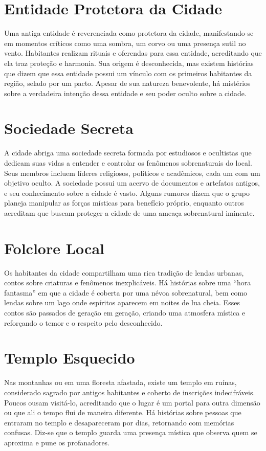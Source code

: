 \section{Entidade Protetora da Cidade}
Uma antiga entidade é reverenciada como protetora da cidade, manifestando-se em momentos críticos como uma sombra, um corvo ou uma presença sutil no vento. Habitantes realizam rituais e oferendas para essa entidade, acreditando que ela traz proteção e harmonia. Sua origem é desconhecida, mas existem histórias que dizem que essa entidade possui um vínculo com os primeiros habitantes da região, selado por um pacto. Apesar de sua natureza benevolente, há mistérios sobre a verdadeira intenção dessa entidade e seu poder oculto sobre a cidade.

\section{Sociedade Secreta}
A cidade abriga uma sociedade secreta formada por estudiosos e ocultistas que dedicam suas vidas a entender e controlar os fenômenos sobrenaturais do local. Seus membros incluem líderes religiosos, políticos e acadêmicos, cada um com um objetivo oculto. A sociedade possui um acervo de documentos e artefatos antigos, e seu conhecimento sobre a cidade é vasto. Alguns rumores dizem que o grupo planeja manipular as forças místicas para benefício próprio, enquanto outros acreditam que buscam proteger a cidade de uma ameaça sobrenatural iminente.

\section{Folclore Local}
Os habitantes da cidade compartilham uma rica tradição de lendas urbanas, contos sobre criaturas e fenômenos inexplicáveis. Há histórias sobre uma ``hora fantasma'' em que a cidade é coberta por uma névoa sobrenatural, bem como lendas sobre um lago onde espíritos aparecem em noites de lua cheia. Esses contos são passados de geração em geração, criando uma atmosfera mística e reforçando o temor e o respeito pelo desconhecido.

\section{Templo Esquecido}
Nas montanhas ou em uma floresta afastada, existe um templo em ruínas, considerado sagrado por antigos habitantes e coberto de inscrições indecifráveis. Poucos ousam visitá-lo, acreditando que o lugar é um portal para outra dimensão ou que ali o tempo flui de maneira diferente. Há histórias sobre pessoas que entraram no templo e desapareceram por dias, retornando com memórias confusas. Diz-se que o templo guarda uma presença mística que observa quem se aproxima e pune os profanadores.


